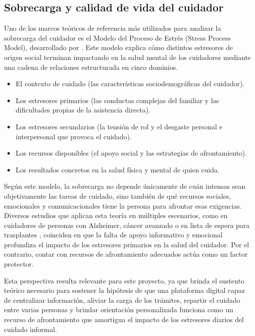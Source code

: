\subsection{Sobrecarga y calidad de vida del cuidador}

Uno de los marcos teóricos de referencia más utilizados para analizar la sobrecarga del cuidador es el Modelo del Proceso de Estrés (Stress Process Model), desarrollado por \citet{pearlin1990}. Este modelo explica cómo distintos estresores de origen social terminan impactando en la salud mental de los cuidadores mediante una cadena de relaciones estructurada en cinco dominios.

\begin{itemize}
    \item El contexto de cuidado (las características sociodemográficas del cuidador).
    \item Los estresores primarios (las conductas complejas del familiar y las dificultades propias de la asistencia directa).
    \item Los estresores secundarios (la tensión de rol y el desgaste personal e interpersonal que provoca el cuidado).
    \item Los recursos disponibles (el apoyo social y las estrategias de afrontamiento).
    \item Los resultados concretos en la salud física y mental de quien cuida.
\end{itemize}

Según este modelo, la sobrecarga no depende únicamente de cuán intensas sean objetivamente las tareas de cuidado, sino también de qué recursos sociales, emocionales y comunicacionales tiene la persona para afrontar esas exigencias. Diversos estudios que aplican esta teoría en múltiples escenarios, como en cuidadores de personas con Alzheimer, cáncer avanzado o en lista de espera para trasplantes \citep{bolden2008,zhao2022}, coinciden en que la falta de apoyo informativo y emocional profundiza el impacto de los estresores primarios en la salud del cuidador. Por el contrario, contar con recursos de afrontamiento adecuados actúa como un factor protector.

Esta perspectiva resulta relevante para este proyecto, ya que brinda el sustento teórico necesario para sostener la hipótesis de que una plataforma digital capaz de centralizar información, aliviar la carga de los trámites, repartir el cuidado entre varias personas y brindar orientación personalizada funciona como un recurso de afrontamiento que amortigua el impacto de los estresores diarios del cuidado informal.

